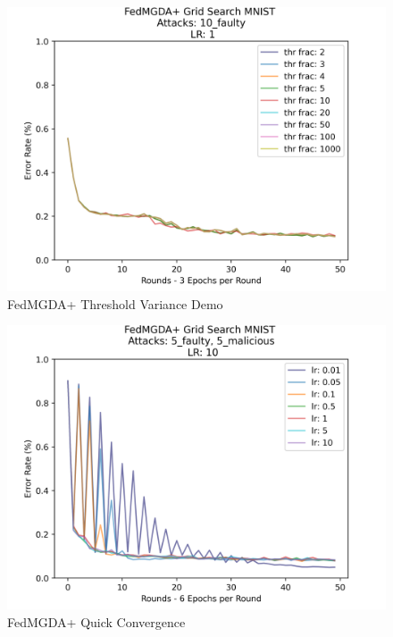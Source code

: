 \begin{figure}[htbp]
	\centering
    \includegraphics[scale=0.5]{initial/graphs/mgda_var.png}
	\caption{FedMGDA+ Threshold Variance Demo}
	\label{fig:mgda_var}
\end{figure}

\begin{figure}[htbp]
	\centering
    \includegraphics[scale=0.5]{initial/graphs/fake_good.png}
	\caption{FedMGDA+ Quick Convergence}
	\label{fig:fake_good}
\end{figure}

